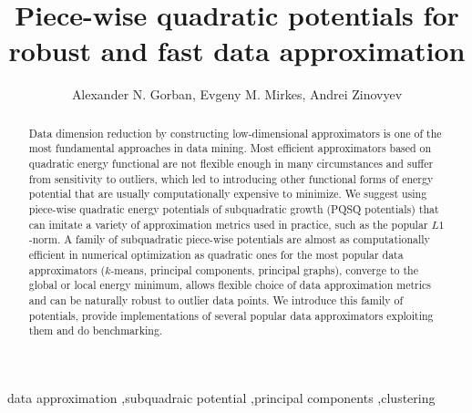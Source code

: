\documentclass[preprint,12pt]{elsarticle}
\begin{document}
\begin{frontmatter}



\title{Piece-wise quadratic potentials for robust and fast data approximation}


\author{Alexander N. Gorban, Evgeny M. Mirkes, Andrei Zinovyev}

\address{Leicester, Paris}

\begin{abstract}
Data dimension reduction by constructing low-dimensional approximators is one of the most fundamental approaches in data mining.
Most efficient approximators based on quadratic energy functional are not flexible enough in many circumstances and suffer from sensitivity to outliers,
which led to introducing other functional forms of energy potential that are usually computationally expensive to minimize.
We suggest using piece-wise quadratic energy potentials of subquadratic growth (PQSQ potentials) that can imitate a variety
of approximation metrics used in practice, such as the popular $L1$-norm. A family of subquadratic piece-wise potentials are almost as computationally
efficient in numerical optimization as quadratic ones for the most popular data approximators ($k$-means, principal components, principal graphs),
converge to the global or local energy minimum, allows flexible choice of data approximation metrics and can be naturally
robust to outlier data points. We introduce this family of potentials, provide implementations of several popular data approximators
exploiting them and do benchmarking.
\end{abstract}

\begin{keyword}
data approximation \sep subquadraic potential \sep principal components \sep clustering


\end{keyword}

\end{frontmatter}
\end{document}
